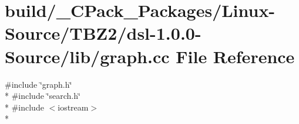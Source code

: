 \section{build/\-\_\-\-C\-Pack\-\_\-\-Packages/\-Linux-\/\-Source/\-T\-B\-Z2/dsl-\/1.0.0-\/\-Source/lib/graph.cc File Reference}
\label{build_2__CPack__Packages_2Linux-Source_2TBZ2_2dsl-1_80_80-Source_2lib_2graph_8cc}
{\ttfamily \#include \char`\"{}graph.\-h\char`\"{}}\\*
{\ttfamily \#include \char`\"{}search.\-h\char`\"{}}\\*
{\ttfamily \#include $<$iostream$>$}\\*

